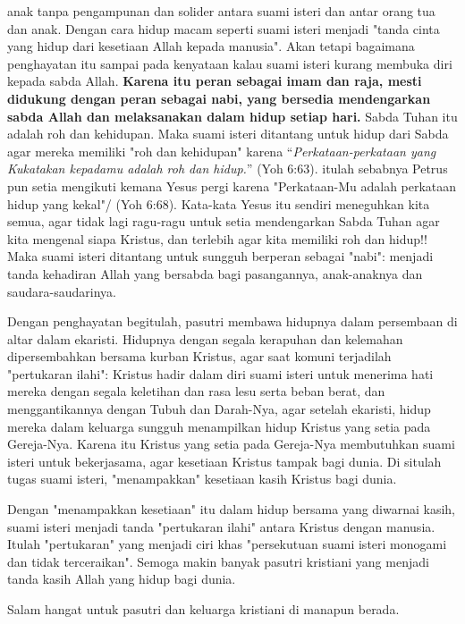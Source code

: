     anak tanpa pengampunan dan solider antara suami isteri dan antar
    orang tua dan anak. Dengan cara hidup macam seperti suami isteri
    menjadi "tanda cinta yang hidup dari kesetiaan Allah kepada manusia".
    Akan tetapi bagaimana penghayatan itu sampai pada kenyataan kalau
    suami isteri kurang membuka diri kepada sabda Allah. \textbf{Karena itu
    peran sebagai imam dan raja, mesti didukung dengan peran sebagai
    nabi, yang bersedia mendengarkan sabda Allah dan melaksanakan dalam
    hidup setiap hari.} Sabda Tuhan itu adalah roh dan kehidupan. Maka
    suami isteri ditantang untuk hidup dari Sabda agar mereka memiliki
    "roh dan kehidupan" karena ``\textit{Perkataan-perkataan yang Kukatakan
    kepadamu adalah roh dan hidup.}'' (Yoh 6:63). itulah sebabnya Petrus
    pun setia mengikuti kemana Yesus pergi karena "Perkataan-Mu adalah
    perkataan hidup yang kekal"/ (Yoh 6:68). Kata-kata Yesus itu sendiri
    meneguhkan kita semua, agar tidak lagi ragu-ragu untuk setia
    mendengarkan Sabda Tuhan agar kita mengenal siapa Kristus, dan
    terlebih agar kita memiliki roh dan hidup!! Maka suami isteri
    ditantang untuk sungguh berperan sebagai "nabi": menjadi tanda
    kehadiran Allah yang bersabda bagi pasangannya, anak-anaknya dan
    saudara-saudarinya.
    
    Dengan penghayatan begitulah, pasutri membawa hidupnya dalam
    persembaan di altar dalam ekaristi. Hidupnya dengan segala kerapuhan
    dan kelemahan dipersembahkan bersama kurban Kristus, agar saat
    komuni terjadilah "pertukaran ilahi": Kristus hadir dalam diri suami
    isteri  untuk menerima hati mereka dengan segala keletihan dan rasa
    lesu serta beban berat, dan menggantikannya dengan  Tubuh dan
    Darah-Nya, agar setelah ekaristi, hidup mereka dalam keluarga
    sungguh menampilkan hidup Kristus yang setia pada Gereja-Nya. 
    Karena itu Kristus yang setia pada Gereja-Nya membutuhkan suami
    isteri untuk bekerjasama, agar kesetiaan Kristus tampak bagi dunia. 
    Di situlah tugas suami isteri, "menampakkan" kesetiaan kasih Kristus
    bagi dunia.
    
    Dengan "menampakkan kesetiaan" itu dalam hidup bersama yang diwarnai
    kasih, suami isteri menjadi tanda "pertukaran ilahi" antara Kristus
    dengan manusia. Itulah "pertukaran" yang menjadi ciri khas
    "persekutuan suami isteri monogami dan tidak terceraikan". Semoga
    makin banyak pasutri kristiani yang menjadi tanda kasih Allah yang
    hidup bagi dunia.

    Salam hangat untuk pasutri dan keluarga kristiani di manapun berada.

\normalsize